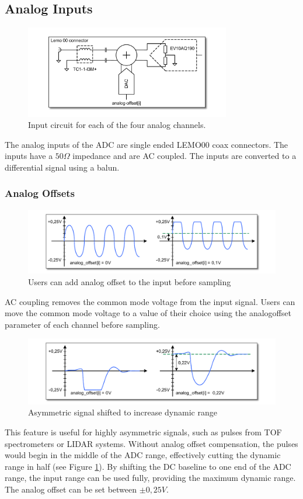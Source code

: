 \subsection{Analog Inputs}
%
\begin{figure}[ht]
    \centering
    \includegraphics[width=0.8\textwidth]{figures/InputCircuit.pdf}
    \caption{Input circuit for each of the four analog channels.}
\end{figure}
%
The analog inputs of the ADC are single ended LEMO00 coax connectors. The inputs have a $50\Omega$ impedance and are AC coupled. The inputs are converted to a differential signal using a balun.
%
%
%
\subsubsection{Analog Offsets}
%
\begin{figure}[ht]
    \centering
    \includegraphics[width=\textwidth]{figures/AnalogOffset_Sine.pdf}
    \caption{Users can add analog offset to the input before sampling}
\end{figure}
%
AC coupling removes the common mode voltage from the input signal. Users can move the common mode voltage to a value of their choice using the analog\tu offset parameter of each channel before sampling.\par
%
\begin{figure}[!ht]
    \centering
    \includegraphics[width=\textwidth]{figures/AnalogOffset_Pulse.pdf}
    \caption{Asymmetric signal shifted to increase dynamic range\label{fig:shiftInput}}
\end{figure}
%
This feature is useful for highly asymmetric signals, such as pulses from TOF spectrometers or LIDAR systems. Without analog offset compensation, the pulses would begin in the middle of the ADC range, effectively cutting the dynamic range in half (see Figure \ref{fig:shiftInput}). By shifting the DC baseline to one end of the ADC range, the input range can be used fully, providing the maximum dynamic range. The analog offset can be set between $\pm 0,25V$.
%
%
%

